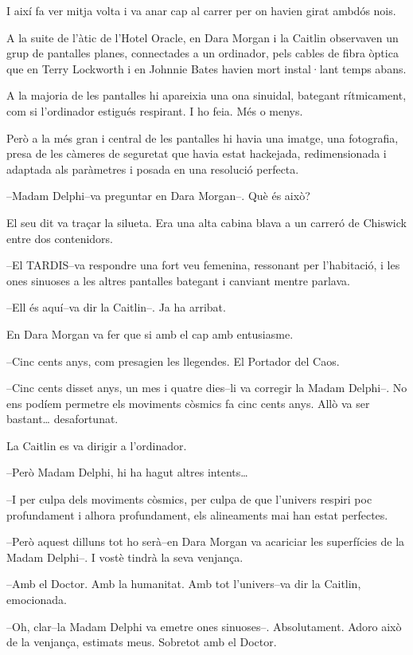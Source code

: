 I així fa ver mitja volta i va anar cap al carrer per on havien girat
ambdós nois.

A la suite de l'àtic de l'Hotel Oracle, en Dara Morgan i la Caitlin
observaven un grup de pantalles planes, connectades a un ordinador, pels
cables de fibra òptica que en Terry Lockworth i en Johnnie Bates havien
mort instal·lant temps abans.

A la majoria de les pantalles hi apareixia una ona sinuidal, bategant
rítmicament, com si l'ordinador estigués respirant. I ho feia. Més o
menys.

Però a la més gran i central de les pantalles hi havia una imatge, una
fotografia, presa de les càmeres de seguretat que havia estat hackejada,
redimensionada i adaptada als paràmetres i posada en una resolució
perfecta.

--Madam Delphi--va preguntar en Dara Morgan--. Què és això?

El seu dit va traçar la silueta. Era una alta cabina blava a un carreró
de Chiswick entre dos contenidors.

--El TARDIS--va respondre una fort veu femenina, ressonant per
l'habitació, i les ones sinuoses a les altres pantalles bategant i
canviant mentre parlava.

--Ell és aquí--va dir la Caitlin--. Ja ha arribat.

En Dara Morgan va fer que si amb el cap amb entusiasme.

--Cinc cents anys, com presagien les llegendes. El Portador del Caos.

--Cinc cents disset anys, un mes i quatre dies--li va corregir la Madam
Delphi--. No ens podíem permetre els moviments còsmics fa cinc cents
anys. Allò va ser bastant\ldots{} desafortunat.

La Caitlin es va dirigir a l'ordinador.

--Però Madam Delphi, hi ha hagut altres intents\ldots{}

--I per culpa dels moviments còsmics, per culpa de que l'univers respiri
poc profundament i alhora profundament, els alineaments mai han estat
perfectes.

--Però aquest dilluns tot ho serà--en Dara Morgan va acariciar les
superfícies de la Madam Delphi--. I vostè tindrà la seva venjança.

--Amb el Doctor. Amb la humanitat. Amb tot l'univers--va dir la Caitlin,
emocionada.

--Oh, clar--la Madam Delphi va emetre ones sinuoses--. Absolutament.
Adoro això de la venjança, estimats meus. Sobretot amb el Doctor.

